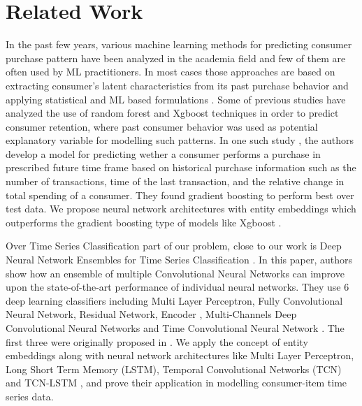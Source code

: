 \section{Related Work}
\label{sec:relatedwork}
In the past few years, various machine learning methods for predicting consumer purchase pattern have been analyzed in
the academia field and few of them are often used by ML practitioners. In most cases those approaches are based on extracting 
consumer's latent characteristics from its past purchase behavior and applying statistical and  
ML based formulations \cite{fader2009probability, choudhury2019machine}. 
Some of previous studies have analyzed the use of random forest and Xgboost techniques in order to predict 
consumer retention, where past consumer behavior was used as potential explanatory variable 
for modelling such patterns. In one such study \cite{martinez2020machine}, the authors develop a model for predicting wether a 
consumer performs a purchase in prescribed future time frame based on historical purchase information such as the number
of transactions, time of the last transaction, and the relative change in total spending of a consumer. 
They found gradient boosting to perform best over test data. We propose neural network architectures with entity embeddings
\cite{guo2016entity} which outperforms the gradient boosting type of models like Xgboost \cite{chen2016xgboost}. 

Over Time Series Classification part of our problem,
close to our work is Deep Neural Network Ensembles for Time Series Classification \cite{fawaz2019deep}. 
In this paper, authors show how an ensemble of multiple Convolutional Neural Networks can improve upon the 
state-of-the-art performance of individual neural networks. They use 6 deep learning classifiers 
including Multi Layer Perceptron, Fully Convolutional Neural Network, Residual Network, 
Encoder \cite{serra2018towards}, Multi-Channels Deep Convolutional Neural Networks \cite{zheng2014time} and 
Time Convolutional Neural Network \cite{zhao2017convolutional}. The first three were originally proposed in \cite{wang2017time}. 
We apply the concept of entity embeddings \cite{guo2016entity} along with neural network architectures
like Multi Layer Perceptron, Long Short Term Memory (LSTM), Temporal Convolutional Networks (TCN) \cite{lea2016temporal} and 
TCN-LSTM \cite{karim2017lstm}, and prove their application in modelling consumer-item time series data.
